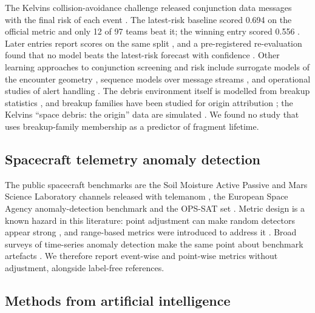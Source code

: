 \documentclass[3p,times]{elsarticle}
\begin{document}
The Kelvins collision-avoidance challenge released conjunction data
messages with the final risk of each event
\citep{uriot2021cacdataset, uriot2022spacecraft}. The latest-risk
baseline scored 0.694 on the official metric and only 12 of 97 teams
beat it; the winning entry scored 0.556 \citep{uriot2022spacecraft}.
Later entries report scores on the same split
\citep{tulczyjew2021predicting}, and a pre-registered re-evaluation
found that no model beats the latest-risk forecast with confidence
\citep{vazquez2026latest}. Other learning approaches to conjunction
screening and risk include surrogate models of the encounter geometry
\citep{acciarini2021kessler, acciarini2024improving}, sequence models
over message streams \citep{chu2024conjunction, chu2026conjunction}, and
operational studies of alert handling
\citep{stevenson2022towards, lidtke2019optimising}. The debris
environment itself is modelled from breakup statistics
\citep{johnson2001nasa, kessler1978collision}, and breakup families have
been studied for origin attribution
\citep{wu2023investigation, celletti2021reconnecting}; the Kelvins
``space debris: the origin'' data are simulated
\citep{efthymiopoulos2021origin, esa2021kelvinsorigin}. We found no
study that uses breakup-family membership as a predictor of fragment
lifetime.

\subsection{Spacecraft telemetry anomaly
detection}\label{spacecraft-telemetry-anomaly-detection}

The public spacecraft benchmarks are the Soil Moisture Active Passive
and Mars Science Laboratory channels released with telemanom
\citep{hundman2018}, the European Space Agency anomaly-detection
benchmark \citep{kotowski2026esaadb, esaadb_dataset} and the OPS-SAT set
\citep{ruszczak2025opssat}. Metric design is a known hazard in this
literature: point adjustment can make random detectors appear strong
\citep{kim2022rigorous, wu2021flawed}, and range-based metrics were
introduced to address it \citep{tatbul2018precision}. Broad surveys of
time-series anomaly detection make the same point about benchmark
artefacts
\citep{schmidl2022anomaly, paparrizos2022tsbuad, sehili2023flawed}. We
therefore report event-wise and point-wise metrics without adjustment,
alongside label-free references.

\subsection{Methods from artificial
intelligence}\label{methods-from-artificial-intelligence}
\end{document}
